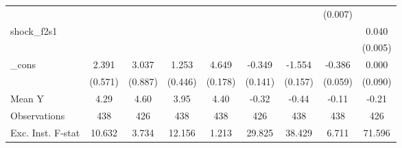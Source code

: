 {\begin{tabular}{l*{8}{c}}
            &                     &                     &                     &                     &                     &                     &     (0.007)         &                     \\
\addlinespace
shock\_f2s1  &                     &                     &                     &                     &                     &                     &                     &       0.040\sym{***}\\
            &                     &                     &                     &                     &                     &                     &                     &     (0.005)         \\
\addlinespace
\_cons      &       2.391\sym{***}&       3.037\sym{***}&       1.253\sym{**} &       4.649\sym{***}&      -0.349\sym{**} &      -1.554\sym{***}&      -0.386\sym{***}&       0.000         \\
            &     (0.571)         &     (0.887)         &     (0.446)         &     (0.178)         &     (0.141)         &     (0.157)         &     (0.059)         &     (0.090)         \\
\midrule
Mean Y      &        4.29         &        4.60         &        3.95         &        4.40         &       -0.32         &       -0.44         &       -0.11         &       -0.21         \\
Observations&         438         &         426         &         438         &         438         &         426         &         438         &         438         &         426         \\
Exc. Inst. F-stat&      10.632         &       3.734         &      12.156         &       1.213         &      29.825         &      38.429         &       6.711         &      71.596         \\
\bottomrule
\end{tabular}
}
